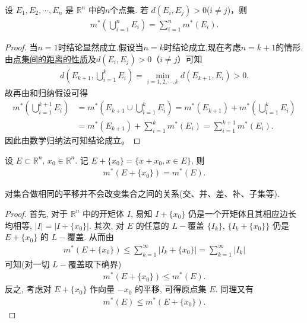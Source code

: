 \documentclass[../../main.tex]{subfiles}%
\begin{document}
\begin{corollary}\label{corollary:距离大于零的两个点集的外测度满足可数可加性}
设 \(E_1, E_2,\cdots,E_n\) 是 \(\mathbb{R}^n\) 中的$n$个点集. 若 \(d(E_i, E_j)>0\)($i\ne j$)，则
\begin{align*}
m^*\left( \bigcup_{i=1}^n{E_i} \right) =\sum_{i=1}^n{m^*\left( E_i \right)}.
\end{align*}
\end{corollary}
\begin{proof}
当$n=1$时结论显然成立.假设当$n=k$时结论成立,现在考虑$n=k+1$的情形.由\hyperref[proposition:点集间的距离的性质]{点集间的距离的性质}及$d(E_i,E_j)>0$（$i\neq j$）可知
\begin{align*}
d\left(E_{k + 1},\bigcup_{i = 1}^kE_i\right)=\min_{i = 1,2,\cdots,k}d\left(E_{k + 1},E_i\right)>0.
\end{align*}
故再由和归纳假设可得
\begin{align*}
m^*\left(\bigcup_{i = 1}^{k + 1}E_i\right)&=m^*\left(E_{k + 1}\cup\bigcup_{i = 1}^kE_i\right)=m^*\left(E_{k + 1}\right)+m^*\left(\bigcup_{i = 1}^kE_i\right)\\
&=m^*\left(E_{k + 1}\right)+\sum_{i = 1}^km^*(E_i)
=\sum_{i = 1}^{k + 1}m^*(E_i).
\end{align*}
因此由数学归纳法可知结论成立。 
\end{proof}

\begin{theorem}[外测度的平移不变性]\label{theorem:外测度的平移不变性}
设 \(E \subset \mathbb{R}^n\), \(x_0 \in \mathbb{R}^n\). 记 \(E + \{x_0\} = \{x + x_0, x \in E\}\), 则
\begin{align}
m^*(E + \{x_0\}) = m^*(E). \label{eq:2.1}
\end{align}
\end{theorem}
\begin{remark}
对集合做相同的平移并不会改变集合之间的关系(交、并、差、补、子集等).
\end{remark}
\begin{proof}
首先, 对于 \(\mathbb{R}^n\) 中的开矩体 \(I\), 易知 \(I + \{x_0\}\) 仍是一个开矩体且其相应边长均相等, \(|I| = |I + \{x_0\}|\). 其次, 对 \(E\) 的任意的 \(L -\)覆盖 \(\{I_k\}\), \(\{I_k + \{x_0\}\}\) 仍是 \(E + \{x_0\}\) 的 \(L -\)覆盖. 从而由
\begin{align*}
m^*(E + \{x_0\}) \leqslant  \sum_{k = 1}^{\infty} |I_k + \{x_0\}| = \sum_{k = 1}^{\infty} |I_k|
\end{align*}
可知(对一切 \(L -\)覆盖取下确界)
\begin{align*}
m^*(E + \{x_0\}) \leqslant  m^*(E).
\end{align*}
反之, 考虑对 \(E + \{x_0\}\) 作向量 \(-x_0\) 的平移, 可得原点集 \(E\). 同理又有
\begin{align*}
m^*(E) \leqslant  m^*(E + \{x_0\}).
\end{align*} 
\end{proof}
\end{document}
